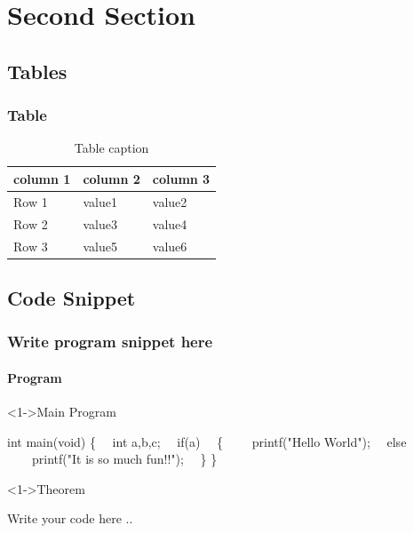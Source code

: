 \documentclass[table,10pt,red]{beamer}	%
\begin{document}
\section{Second Section}
\subsection{Tables} %
\begin{frame}
\frametitle{Table}
\begin{table}
\begin{tabular}{l l l}
\toprule
\textbf{column 1} & \textbf{column 2} & \textbf{column 3}\\
\midrule
Row 1 & value1 & value2 \\
Row 2 & value3 & value4 \\
Row 3 & value5 & value6 \\
\bottomrule
\end{tabular}
\caption{Table caption}
\end{table}
\end{frame}


\subsection{Code Snippet} %
\begin{frame}[shrink = 2,fragile]
	\frametitle{Write program snippet here} \pause
	\framesubtitle{Program}
		\begin{block}<1->{Main Program}	\pause
		\begin{semiverbatim}
				\scriptsize{
				int main(void)
				\{
			\ \		int a,b,c;
			\ \		if(a)
			\ \		\{
			\ \ \ \			printf("Hello World");
			\ \ 	else	
			\ \ \ \			printf("It is so much fun!!");
			\ \		\}
				\}
 }
			\end{semiverbatim}
		\end{block} \pause
	
	\begin{block}<1->{Theorem}	\pause
		\begin{semiverbatim}
				Write your code here .. 
			\end{semiverbatim}
		\end{block} \pause
\end{frame}
\end{document}
